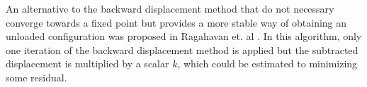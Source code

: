 An alternative to the backward displacement method that do not
necessary converge towards a fixed point but provides a more stable
way of obtaining an unloaded configuration was proposed in Ragahavan
et. al \cite{raghavan2006non}. In this algorithm, only one iteration of the
backward displacement method is applied but the subtracted
displacement is multiplied by a scalar $k$, which could be estimated
to minimizing some residual.





